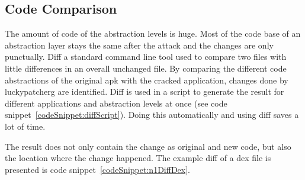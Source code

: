 \subsection{Code Comparison} \label{subsection:forensics-tools-diff}
The amount of code of the abstraction levels is huge.
Most of the code base of an abstraction layer stays the same after the attack and the changes are only punctually.
Diff a standard command line tool used to compare two files with little differences in an overall unchanged file.
\newline
By comparing the different code abstractions of the original \gls{apk} with the cracked application, changes done by \gls{luckypatcherg} are identified.
Diff is used in a script to generate the result for different applications and abstraction levels at once (see code snippet~\ref{codeSnippet:diffScript}).
Doing this automatically and using diff saves a lot of time.
\newline

The result does not only contain the change as original and new code, but also the location where the change happened.
The example diff of a dex file is presented is code snippet~\ref{codeSnippet:n1DiffDex}.
\newline

